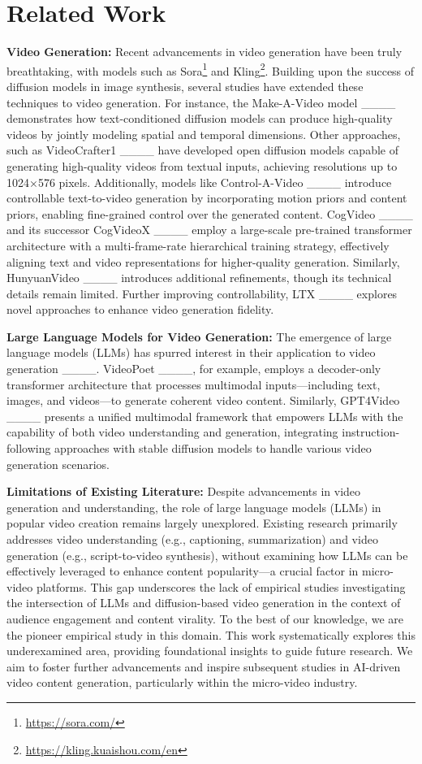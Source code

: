 \section{Related Work}
\noindent \textbf{Video Generation:} Recent advancements in video generation have been truly breathtaking, with models such as Sora\footnote{\url{https://sora.com/}} and Kling\footnote{\url{https://kling.kuaishou.com/en}}. Building upon the success of diffusion models in image synthesis, several studies have extended these techniques to video generation. For instance, the Make-A-Video model ____ demonstrates how text-conditioned diffusion models can produce high-quality videos by jointly modeling spatial and temporal dimensions. Other approaches, such as VideoCrafter1 ____ have developed open diffusion models capable of generating high-quality videos from textual inputs, achieving resolutions up to 1024×576 pixels. Additionally, models like Control-A-Video ____ introduce controllable text-to-video generation by incorporating motion priors and content priors, enabling fine-grained control over the generated content.  CogVideo ____ and its successor CogVideoX ____ employ a large-scale pre-trained transformer architecture with a multi-frame-rate hierarchical training strategy, effectively aligning text and video representations for higher-quality generation. Similarly, HunyuanVideo ____ introduces additional refinements, though its technical details remain limited. Further improving controllability, LTX ____ explores novel approaches to enhance video generation fidelity.


\noindent \textbf{Large Language Models for Video Generation:} The emergence of large language models (LLMs) has spurred interest in their application to video generation ____. VideoPoet ____, for example, employs a decoder-only transformer architecture that processes multimodal inputs—including text, images, and videos—to generate coherent video content. Similarly, GPT4Video ____ presents a unified multimodal framework that empowers LLMs with the capability of both video understanding and generation, integrating instruction-following approaches with stable diffusion models to handle various video generation scenarios.

\noindent \textbf{Limitations of Existing Literature:} Despite advancements in video generation and understanding, the role of large language models (LLMs) in popular video creation remains largely unexplored. Existing research primarily addresses video understanding (e.g., captioning, summarization) and video generation (e.g., script-to-video synthesis), without examining how LLMs can be effectively leveraged to enhance content popularity—a crucial factor in micro-video platforms. This gap underscores the lack of empirical studies investigating the intersection of LLMs and diffusion-based video generation in the context of audience engagement and content virality. To the best of our knowledge, we are the pioneer empirical study in this domain. This work systematically explores this underexamined area, providing foundational insights to guide future research. We aim to foster further advancements and inspire subsequent studies in AI-driven video content generation, particularly within the micro-video industry.